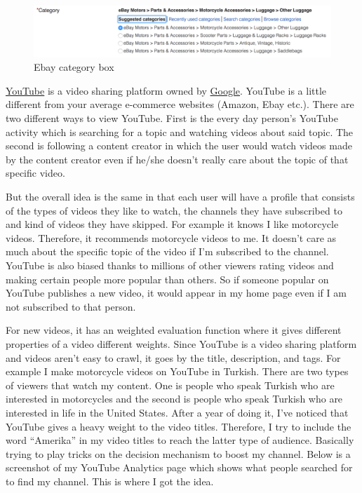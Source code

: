 \documentclass[10pt,letterpaper,bibliography=totoc]{scrartcl}
\begin{document}
\begin{figure}[h!]
\centering
\label{fig:ebay-category}
\includegraphics[scale=.5]{ebay-category.png}
\caption{Ebay category box}
\end{figure}

\href{www.youtube.com}{YouTube} is a video sharing platform owned by \href{www.google.com}{Google}. YouTube is a little different from your average e-commerce websites (Amazon, Ebay etc.). There are two different ways to view YouTube. First is the every day person's YouTube activity which is searching for a topic and watching videos about said topic. The second is following a content creator in which the user would watch videos made by the content creator even if he/she doesn't really care about the topic of that specific video. 

But the overall idea is the same in that each user will have a profile that consists of the types of videos they like to watch, the channels they have subscribed to and kind of videos they have skipped. For example it knows I like motorcycle videos. Therefore, it recommends motorcycle videos to me. It doesn't care as much about the specific topic of the video if I'm subscribed to the channel. YouTube is also biased thanks to millions of other viewers rating videos and making certain people more popular than others. So if someone popular on YouTube publishes a new video, it would appear in my home page even if I am not subscribed to that person. 

For new videos, it has an weighted evaluation function where it gives different properties of a video different weights. Since YouTube is a video sharing platform and videos aren't easy to crawl, it goes by the title, description, and tags. For example I make motorcycle videos on YouTube in Turkish. There are two types of viewers that watch my content. One is people who speak Turkish who are interested in motorcycles and the second is people who speak Turkish who are interested in life in the United States. After a year of doing it, I've noticed that YouTube gives a heavy weight to the video titles. Therefore, I try to include the word ``Amerika'' in my video titles to reach the latter type of audience. Basically trying to play tricks on the decision mechanism to boost my channel. Below is a screenshot of my YouTube Analytics page which shows what people searched for to find my channel. This is where I got the idea.
\end{document}
